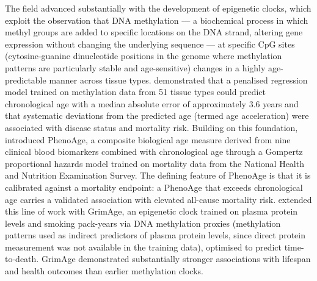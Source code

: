 \documentclass[11pt,a4paper]{report}
\begin{document}
The field advanced substantially with the development of epigenetic clocks, which exploit the
observation that DNA methylation --- a biochemical process in which methyl groups are added to
specific locations on the DNA strand, altering gene expression without changing the underlying
sequence --- at specific CpG sites (cytosine-guanine dinucleotide positions in the genome where
methylation patterns are particularly stable and age-sensitive) changes in a highly age-predictable
manner across tissue types. \citet{Horvath2013} demonstrated that a penalised
regression model trained on methylation data from 51 tissue types could predict chronological age
with a median absolute error of approximately 3.6 years and that systematic deviations from the
predicted age (termed age acceleration) were associated with disease status and mortality risk.
Building on this foundation, \citet{Levine2018} introduced PhenoAge, a composite biological age
measure derived from nine clinical blood biomarkers combined with chronological age through a
Gompertz proportional hazards model trained on mortality data from the National Health and Nutrition
Examination Survey. The defining feature of PhenoAge is that it is calibrated against a mortality
endpoint: a PhenoAge that exceeds chronological age carries a validated association with elevated
all-cause mortality risk. \citet{Lu2019} extended this line of work with GrimAge, an epigenetic
clock trained on plasma protein levels and smoking pack-years via DNA methylation proxies
(methylation patterns used as indirect predictors of plasma protein levels, since direct protein
measurement was not available in the training data), optimised to predict time-to-death. GrimAge demonstrated substantially stronger associations with lifespan and
health outcomes than earlier methylation clocks.
\end{document}
